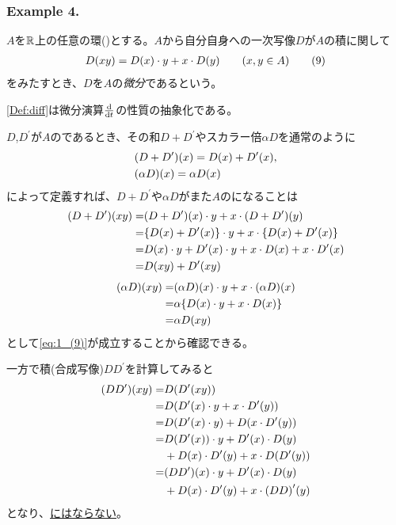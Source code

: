 \documentclass[fleqn,twocolumn,titlepage,dvipdfmx]{jsarticle}
\begin{document}
\subsubsection*{Example 4.}
\begin{definition}[微分]\label{Def:diff}
  $A$を$\mathbb{R}$上の任意の環({})とする。$A$から自分自身への一次写像$D$が$A$の積に関して
  \begin{align*}
    D(xy)=D(x)\cdot y+x\cdot D(y)\qq{}(x,y\in A)
    \tag{9}\label{eq:1_(9)}
  \end{align*}
  をみたすとき、$D$を$A$の\emph{微分}であるという。
\end{definition}

\begin{remark}
  \cref{Def:diff}は微分演算$\dv{t}$の性質の抽象化である。
\end{remark}

\begin{remark}
  $D$,$D^\prime$が$A$の{}であるとき、その和$D+D^\prime$やスカラー倍$\alpha D$を通常のように
  \begin{align*}
    &\qty(D+D^\prime)(x) = D(x)+D^\prime(x),\\
    &\qty(\alpha D)(x)=\alpha D(x)
  \end{align*}
  によって定義すれば、$D+D^\prime$や$\alpha D$がまた$A$の{}になることは
  \begin{align*}
    (D+D^\prime)(xy)=&(D+D^\prime)(x)\cdot y+x\cdot (D+D^\prime)(y)\\
    =&\qty{D(x)+D^\prime(x)}\cdot y+x\cdot\qty{D(x)+D^\prime(x)}\\
    =&D(x)\cdot y+D^\prime(x)\cdot y+x\cdot D(x)+x\cdot D^\prime(x)\\
    =&D(xy)+D^\prime(xy)
  \end{align*}
  \begin{align*}
    \qty(\alpha D)(xy) =& \qty(\alpha D)(x)\cdot y+x\cdot\qty(\alpha D)(x)\\
    =& \alpha \qty{D(x)\cdot y+x\cdot D(x)}\\
    =& \alpha D(xy)
  \end{align*}
  として\eqref{eq:1_(9)}が成立することから確認できる。

  一方で積(合成写像)$DD^\prime$を計算してみると
  \begin{align*}
    \qty(DD^\prime)(xy) =& D\qty(D^\prime(xy))\\
    =& D\qty(D^\prime(x)\cdot y+x\cdot D^\prime(y))\\
    =& D\qty(D^\prime(x)\cdot y) + D\qty(x\cdot D^\prime(y))\\
    =& D\qty(D^\prime(x))\cdot y + D^\prime(x)\cdot D(y)\\
    & +D(x)\cdot D^\prime(y)+ x\cdot D\qty(D^\prime(y))\\
    =& \qty(DD^\prime)(x)\cdot y + D^\prime(x)\cdot D(y)\\
    & +D(x)\cdot D^\prime(y)+ x\cdot \qty(DD)^\prime(y)
  \end{align*}
  となり、\underline{{}にはならない}。
\end{remark}
\end{document}

